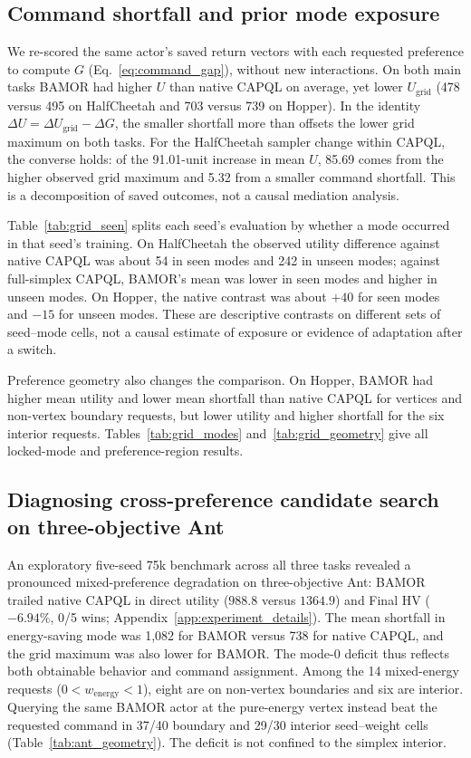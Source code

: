 \subsection{Command shortfall and prior mode exposure}
\label{sec:command_diagnostics}

We re-scored the same actor's saved return vectors with each requested
preference to compute $G$ (Eq.~\eqref{eq:command_gap}), without new
interactions. On both main tasks BAMOR had higher $U$ than native CAPQL on
average, yet lower $U_{\mathrm{grid}}$ (478 versus 495 on HalfCheetah
and 703 versus 739 on Hopper). In the identity
$\Delta U=\Delta U_{\mathrm{grid}}-\Delta G$, the smaller shortfall more
than offsets the lower grid maximum on both tasks. For the
HalfCheetah sampler change within CAPQL, the converse holds: of the
91.01-unit increase in mean $U$, 85.69 comes from the higher observed
grid maximum and 5.32 from a smaller command shortfall. This is a
decomposition of saved outcomes, not a causal mediation analysis.

Table~\ref{tab:grid_seen} splits each seed's evaluation by whether a mode
occurred in that seed's training. On HalfCheetah the observed utility
difference against native CAPQL was about 54 in seen modes and 242 in unseen
modes; against full-simplex CAPQL, BAMOR's mean was lower in seen modes and
higher in unseen modes. On Hopper, the native contrast was about $+40$ for
seen modes and $-15$ for unseen modes. These are descriptive contrasts on
different sets of seed--mode cells, not a causal estimate of exposure or
evidence of adaptation after a switch.



Preference geometry also changes the comparison. On Hopper, BAMOR had
higher mean utility and lower mean shortfall than native CAPQL for vertices
and non-vertex boundary requests, but lower utility and higher shortfall
for the six interior requests. Tables~\ref{tab:grid_modes}
and~\ref{tab:grid_geometry} give all locked-mode and preference-region results.
\FloatBarrier

\subsection{Diagnosing cross-preference candidate search on three-objective Ant}
\label{sec:ant_diagnosis}

An exploratory five-seed 75k benchmark across all three tasks revealed a
pronounced mixed-preference degradation on three-objective Ant: BAMOR trailed
native CAPQL in direct utility ($988.8$ versus $1364.9$) and Final HV ($-6.94\%$,
0/5 wins; Appendix~\ref{app:experiment_details}). The mean shortfall in
energy-saving mode was 1,082 for BAMOR versus 738 for native CAPQL, and
the grid maximum was also lower for BAMOR. The mode-0 deficit thus reflects
both obtainable behavior and command assignment. Among the 14 mixed-energy
requests ($0 < w_{\mathrm{energy}} < 1$), eight are on non-vertex boundaries
and six are interior. Querying the same BAMOR actor at the pure-energy vertex
instead beat the requested command in 37/40 boundary and 29/30 interior
seed--weight cells (Table~\ref{tab:ant_geometry}). The deficit is not
confined to the simplex interior.

